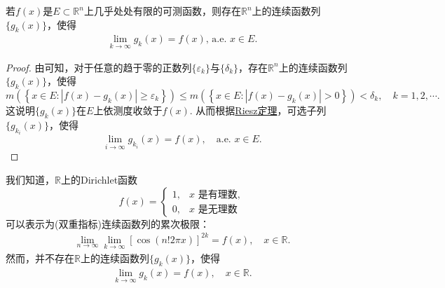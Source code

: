 \documentclass[../../main.tex]{subfiles}%
\begin{document}
\begin{corollary}\label{corollary:推论3.20}
若\(f(x)\)是\(E \subset \mathbb{R}^{n}\)上几乎处处有限的可测函数，则存在\(\mathbb{R}^{n}\)上的连续函数列\(\{g_{k}(x)\}\)，使得
\begin{align*}
\lim_{k \to \infty} g_{k}(x) = f(x), \,\text{a.e. } x \in E. 
\end{align*}
\end{corollary}
\begin{proof}
由可知，对于任意的趋于零的正数列\(\{\varepsilon_{k}\}\)与\(\{\delta_{k}\}\)，存在\(\mathbb{R}^{n}\)上的连续函数列\(\{g_{k}(x)\}\)，使得
\[
m\left( \left\{ x\in E:\left| f\left( x \right) -g_k\left( x \right) \right|\geqslant \varepsilon _k \right\} \right) \leqslant m\left( \left\{ x\in E:\left| f\left( x \right) -g_k\left( x \right) \right|>0 \right\} \right) <\delta _k,\quad k=1,2,\cdots .
\]
这说明\(\{g_{k}(x)\}\)在\(E\)上依测度收敛于\(f(x)\). 从而根据\hyperref[theorem:Riesz定理]{Riesz定理}，可选子列\(\{g_{k_{i}}(x)\}\)，使得
\[\lim_{i \to \infty} g_{k_{i}}(x) = f(x), \quad \text{a.e. } x \in E.\] 
\end{proof}
\begin{remark}
我们知道，\(\mathbb{R}\)上的Dirichlet函数
\[f(x)=
\begin{cases}
1, & x\text{ 是有理数},\\
0, & x\text{ 是无理数}
\end{cases}\]
可以表示为(双重指标)连续函数列的累次极限：
\begin{align*}
\lim_{n \to \infty}\lim_{k \to \infty}[\cos(n!2\pi x)]^{2k}=f(x),\quad x\in\mathbb{R}.
\end{align*}
然而，并不存在\(\mathbb{R}\)上的连续函数列\(\{g_{k}(x)\}\)，使得
\begin{align*}
\lim_{k \to \infty}g_{k}(x)=f(x),\quad x\in\mathbb{R}.
\end{align*} 
\end{remark}
\end{document}
